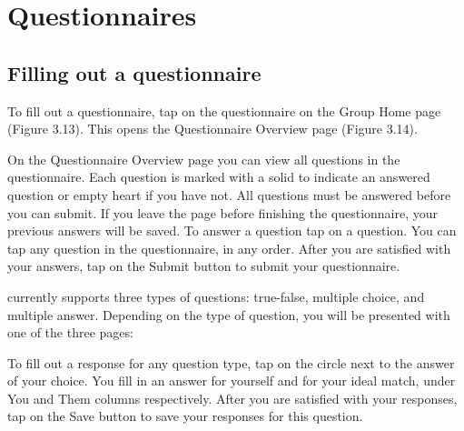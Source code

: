 \section{Questionnaires}
\label{sec:questionnaires}
\subsection{Filling out a questionnaire}
\label{sec:questionnaire-fill}
To fill out a questionnaire, tap on the questionnaire on the Group Home page (Figure 3.13). This opens the Questionnaire Overview page (Figure 3.14). 

On the Questionnaire Overview page you can view all questions in the questionnaire.  Each question is marked with a solid   to indicate an answered question or empty heart   if you have not.  All questions must be answered before you can submit.  If you leave the page before finishing the questionnaire, your previous answers will be saved. To answer a question tap on a question.  You can tap any question in the questionnaire, in any order.  After you are satisfied with your answers, tap on the Submit button to submit your questionnaire.  

\Friending{} currently supports three types of questions: true-false, multiple choice, and multiple answer.  Depending on the type of question, you will be presented with one of the three pages:

To fill out a response for any question type, tap on the circle next to the answer of your choice.
You fill in an answer for yourself and for your ideal match, under You and Them columns respectively.  After you are satisfied with your responses, tap on the Save button to save your responses for this question.


